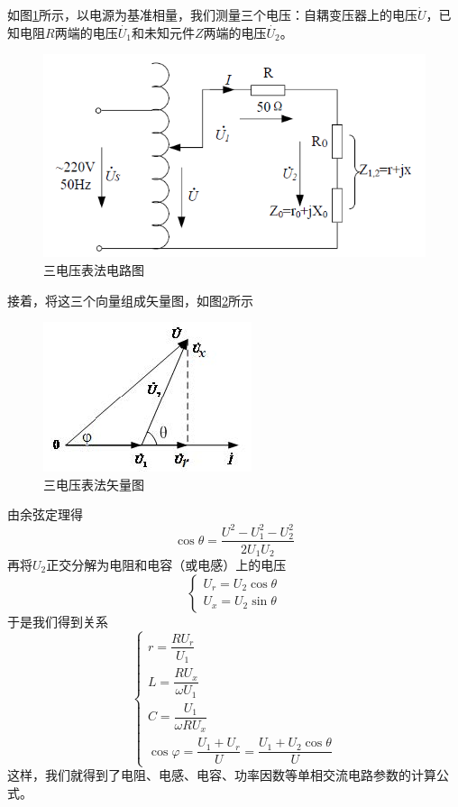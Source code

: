 \documentclass{ctexart}
\begin{document}
如图\ref{fig:三电压表法电路图}所示，以电源为基准相量，我们测量三个电压：自耦变压器上的电压$\Dot{U}$，已知电阻$R$两端的电压$\Dot{U_1}$和未知元件$Z$两端的电压$\Dot{U_2}$。
\begin{figure}[!ht]
    \centering
    \includegraphics{pic/三电压表法电路图.png}
    \caption{三电压表法电路图}
    \label{fig:三电压表法电路图}
\end{figure}
接着，将这三个向量组成矢量图，如图\ref{fig:三电压表法矢量图}所示
\begin{figure}[!ht]
    \centering
    \includegraphics{pic/三电压表法矢量图.jpg}
    \caption{三电压表法矢量图}
    \label{fig:三电压表法矢量图}
\end{figure}
由余弦定理得
\begin{equation}
    \cos \theta = \dfrac{U^2-U_1^2-U_2^2}{2U_1U_2}
\end{equation}
再将$U_2$正交分解为电阻和电容（或电感）上的电压
\begin{equation}
    \begin{cases}
        U_r=U_2 \cos \theta\\
        U_x=U_2 \sin \theta
    \end{cases}
\end{equation}
于是我们得到关系
\begin{equation}
    \begin{cases}
        r=\dfrac{RU_r}{U_1}\\
        L=\dfrac{RU_x}{\omega U_1}\\
        C=\dfrac{U_1}{\omega R U_x}\\
        \cos \varphi = \dfrac{U_1+U_r}{U}=\dfrac{U_1+U_2\cos \theta}{U}
    \end{cases}
\end{equation}
这样，我们就得到了电阻、电感、电容、功率因数等单相交流电路参数的计算公式。
\end{document}
